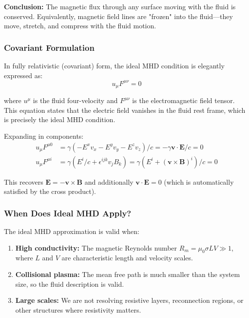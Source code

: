 \documentclass[12pt,a4paper]{article}
\begin{document}
\textbf{Conclusion:} The magnetic flux through any surface moving with the fluid
is conserved. Equivalently, magnetic field lines are "frozen" into the fluid---they
move, stretch, and compress with the fluid motion.

\subsubsection{Covariant Formulation}

In fully relativistic (covariant) form, the ideal MHD condition is elegantly expressed as:
\begin{equation}
u_\mu F^{\mu\nu} = 0
\label{eq:ideal_mhd_covariant}
\end{equation}

where $u^\mu$ is the fluid four-velocity and $F^{\mu\nu}$ is the electromagnetic
field tensor. This equation states that the electric field vanishes in the fluid
rest frame, which is precisely the ideal MHD condition.

Expanding in components:
\begin{align}
u_\mu F^{\mu 0} &= \gamma(-E^x v_x - E^y v_y - E^z v_z)/c = -\gamma \bm{v} \cdot \bm{E}/c = 0 \\
u_\mu F^{\mu i} &= \gamma(E^i/c + \epsilon^{ijk} v_j B_k) = \gamma(E^i + (\bm{v} \times \bm{B})^i)/c = 0
\end{align}

This recovers $\bm{E} = -\bm{v} \times \bm{B}$ and additionally $\bm{v} \cdot \bm{E} = 0$
(which is automatically satisfied by the cross product).

\subsubsection{When Does Ideal MHD Apply?}

The ideal MHD approximation is valid when:
\begin{enumerate}
    \item \textbf{High conductivity:} The magnetic Reynolds number $R_m = \mu_0 \sigma L V \gg 1$,
        where $L$ and $V$ are characteristic length and velocity scales.
    \item \textbf{Collisional plasma:} The mean free path is much smaller than the
        system size, so the fluid description is valid.
    \item \textbf{Large scales:} We are not resolving resistive layers, reconnection
        regions, or other structures where resistivity matters.
\end{enumerate}
\end{document}
